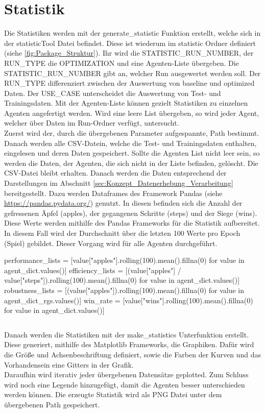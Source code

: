 \section{Statistik} \label{sec:Implementierung_Statistiken}
Die Statistiken werden mit der generate\_statistic Funktion erstellt, welche sich in der statisticTool Datei befindet. Diese ist wiederum im statistic Ordner definiert (siehe \ref{fig:Package_Struktur}). Ihr wird die STATISTIC\_RUN\_NUMBER, der RUN\_TYPE die OPTIMIZATION und eine Agenten-Liste übergeben. Die STATISTIC\_RUN\_NUMBER gibt an, welcher Run ausgewertet werden soll. Der RUN\_TYPE differenziert zwischen der Auswertung von baseline und optimized Daten. Der USE\_CASE unterscheidet die Auswertung von Test- und Trainingsdaten. Mit der Agenten-Liste können gezielt Statistiken zu einzelnen Agenten angefertigt werden. Wird eine leere List übergeben, so wird jeder Agent, welcher über Daten im Run-Ordner verfügt, untersucht.\\
Zuerst wird der, durch die übergebenen Parameter aufgespannte, Path bestimmt. Danach werden alle CSV-Datein, welche die Test- und Trainingsdaten enthalten, eingelesen und deren Daten gespeichert. Sollte die Agenten List nicht leer sein, so werden die Daten, der Agenten, die sich nicht in der Liste befinden, gelöscht. Die CSV-Datei bleibt erhalten.
Danach werden die Daten entsprechend der Darstellungen im Abschnitt \ref{sec:Konzept_Datenerhebung_Verarbeitung} bereitgestellt. Dazu werden Dataframes des Framework Pandas (siehe \url{https://pandas.pydata.org/}) genutzt. In diesen befinden sich die Anzahl der gefressenen Äpfel (apples), der gegangenen Schritte (steps) und der Siege (wins). Diese Werte werden mithilfe des Pandas Frameworks für die Statistik aufbereitet. In diesem Fall wird der Durchschnitt über die letzten 100 Werte pro Epoch (Spiel) gebildet. Dieser Vorgang wird für alle Agenten durchgeführt.
\begin{python}
performance_lists = [value["apples"].rolling(100).mean().fillna(0) for value in agent_dict.values()]
efficiency_lists = [(value["apples"] / value["steps"]).rolling(100).mean().fillna(0) for value in agent_dict.values()]
robustness_lists = [(value["apples"]).rolling(100).mean().fillna(0) for value in agent_dict_rgs.values()]
win_rate = [value["wins"].rolling(100).mean().fillna(0) for value in agent_dict.values()]
\end{python}
\begin{lstlisting}[caption=Erstellung der Daten entsprechende der Evaluationskriterien, label=code:Datenerstellung]
\end{lstlisting}
Danach werden die Statistiken mit der make\_statistics Unterfunktion erstellt.
Diese generiert, mithilfe des Matplotlib Frameworks, die Graphiken. Dafür wird die Größe und Achsenbeschriftung definiert, sowie die Farben der Kurven und das Vorhandensein eine Gitters in der Grafik.\\
Daraufhin wird iterativ jeder übergebenen Datensätze geplotted. Zum Schluss wird noch eine Legende hinzugefügt, damit die Agenten besser unterschieden werden können. Die erzeugte Statistik wird als PNG Datei unter dem übergebenen Path gespeichert.